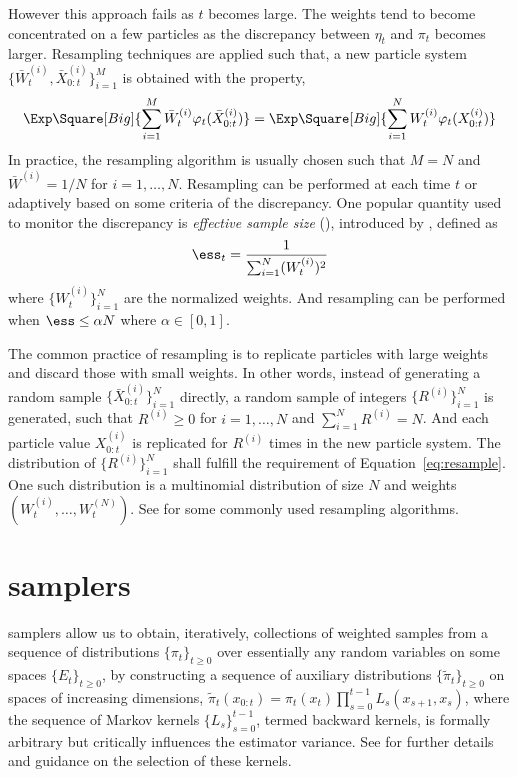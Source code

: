 However this approach fails as $t$ becomes large. The weights tend to become
concentrated on a few particles as the discrepancy between $\eta_t$ and $\pi_t$
becomes larger. Resampling techniques are applied such that, a new particle
system $\{\bar{W}_t^{(i)},\bar{X}_{0:t}^{(i)}\}_{i=1}^M$ is obtained with the
property,
\begin{equation}
  \Exp\Square[Big]{\sum_{i=1}^M\bar{W}_t^{(i)}\varphi_t(\bar{X}_{0:t}^{(i)})} =
  \Exp\Square[Big]{\sum_{i=1}^NW_t^{(i)}\varphi_t(X_{0:t}^{(i)})}
  \label{eq:resample}
\end{equation}
In practice, the resampling algorithm is usually chosen such that $M = N$ and
$\bar{W}^{(i)} = 1/N$ for $i=1,\dots,N$. Resampling can be performed at each
time $t$ or adaptively based on some criteria of the discrepancy. One popular
quantity used to monitor the discrepancy is \emph{effective sample size}
(\ess), introduced by \textcite{Liu:1998iu}, defined as
\begin{equation}
  \ess_t = \frac{1}{\sum_{i=1}^N (W_t^{(i)})^2}
\end{equation}
where $\{W_t^{(i)}\}_{i=1}^N$ are the normalized weights. And resampling can be
performed when $\ess\le \alpha N$ where $\alpha\in[0,1]$.

The common practice of resampling is to replicate particles with large weights
and discard those with small weights. In other words, instead of generating a
random sample $\{\bar{X}_{0:t}^{(i)}\}_{i=1}^N$ directly, a random sample of
integers $\{R^{(i)}\}_{i=1}^N$ is generated, such that $R^{(i)} \ge 0$ for $i =
1,\dots,N$ and $\sum_{i=1}^N R^{(i)} = N$. And each particle value
$X_{0:t}^{(i)}$ is replicated for $R^{(i)}$ times in the new particle system.
The distribution of $\{R^{(i)}\}_{i=1}^N$ shall fulfill the requirement of
Equation~\eqref{eq:resample}. One such distribution is a multinomial
distribution of size $N$ and weights $(W_t^{(i)},\dots,W_t^{(N)})$. See
\textcite{Douc:2005wa} for some commonly used resampling algorithms.

\section{\protect\smc samplers}
\label{sec:SMC Samplers}

\smc samplers allow us to obtain, iteratively, collections of weighted samples
from a sequence of distributions $\{\pi_t\}_{t\ge0}$ over essentially any
random variables on some spaces $\{E_t\}_{t\ge0}$, by constructing a sequence
of auxiliary distributions $\{\tilde\pi_t\}_{t\ge0}$ on spaces of increasing
dimensions, $\tilde\pi_t(x_{0:t})=\pi_t (x_t) \prod_{s=0}^{t-1}
L_s(x_{s+1},x_s)$, where the sequence of Markov kernels $\{L_s\}_{s=0}^{t-1}$,
termed backward kernels, is formally arbitrary but critically influences the
estimator variance. See \textcite{DelMoral:2006hc} for further details and
guidance on the selection of these kernels.

